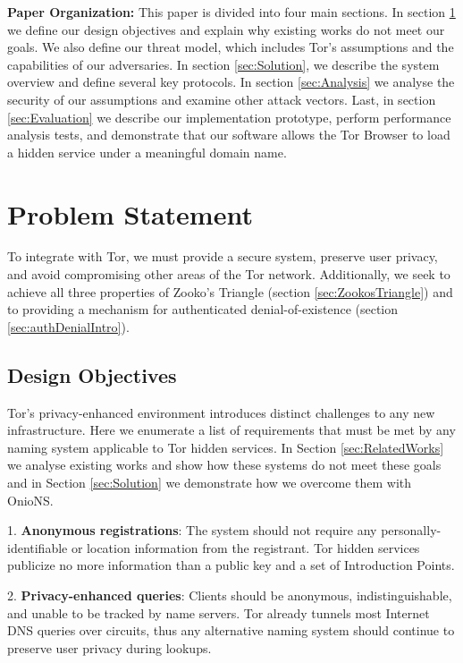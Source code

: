 \documentclass[USenglish,oneside,twocolumn]{article}
\begin{document}
\textbf{Paper Organization:} This paper is divided into four main sections. In section \ref{sec:problemStatement} we define our design objectives and explain why existing works do not meet our goals. We also define our threat model, which includes Tor's assumptions and the capabilities of our adversaries. In section \ref{sec:Solution}, we describe the system overview and define several key protocols. In section \ref{sec:Analysis} we analyse the security of our assumptions and examine other attack vectors. Last, in section \ref{sec:Evaluation} we describe our implementation prototype, perform performance analysis tests, and demonstrate that our software allows the Tor Browser to load a hidden service under a meaningful domain name.

\section{Problem Statement}
\label{sec:problemStatement}

To integrate with Tor, we must provide a secure system, preserve user privacy, and avoid compromising other areas of the Tor network. Additionally, we seek to achieve all three properties of Zooko's Triangle (section \ref{sec:ZookosTriangle}) and to providing a mechanism for authenticated denial-of-existence (section \ref{sec:authDenialIntro}).

\subsection{Design Objectives}

Tor's privacy-enhanced environment introduces distinct challenges to any new infrastructure. Here we enumerate a list of requirements that must be met by any naming system applicable to Tor hidden services. In Section \ref{sec:RelatedWorks} we analyse existing works and show how these systems do not meet these goals and in Section \ref{sec:Solution} we demonstrate how we overcome them with OnioNS.

1. \textbf{Anonymous registrations}: The system should not require any personally-identifiable or location information from the registrant. Tor hidden services publicize no more information than a public key and a set of Introduction Points.

2. \textbf{Privacy-enhanced queries}: Clients should be anonymous, indistinguishable, and unable to be tracked by name servers. Tor already tunnels most Internet DNS queries over circuits, thus any alternative naming system should continue to preserve user privacy during lookups.
\end{document}
